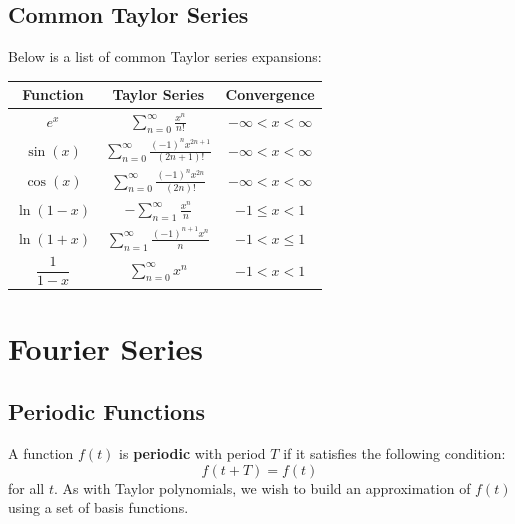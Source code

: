 \documentclass{article}
\begin{document}
\subsection{Common Taylor Series}
Below is a list of common Taylor series expansions:
\begin{table}[H]
    \centering
    \begin{tabular}{c c c}
        \toprule
        \textbf{Function}             & \textbf{Taylor Series}                                                                           & \textbf{Convergence}     \\
        \midrule
        \(e^x\)                       & \(\displaystyle\sum_{n=0}^{\infty} \frac{x^n}{n!}\)                                              & \(-\infty < x < \infty\) \\
        \(\sin{\left( x \right)}\)    & \(\displaystyle\sum_{n=0}^{\infty} \frac{{\left( -1 \right)}^n x^{2n+1}}{\left( 2n+1 \right)!}\) & \(-\infty < x < \infty\) \\
        \(\cos{\left( x \right)}\)    & \(\displaystyle\sum_{n=0}^{\infty} \frac{{\left( -1 \right)}^n x^{2n}}{\left( 2n \right)!}\)     & \(-\infty < x < \infty\) \\
        \(\ln{\left( 1 - x \right)}\) & \(\displaystyle-\sum_{n=1}^{\infty} \frac{x^n}{n}\)                                              & \(-1 \leqslant x < 1\)   \\
        \(\ln{\left( 1 + x \right)}\) & \(\displaystyle\sum_{n=1}^{\infty} \frac{{\left( -1 \right)}^{n+1} x^n}{n}\)                     & \(-1 < x \leqslant 1\)   \\
        \(\dfrac{1}{1 - x}\)          & \(\displaystyle\sum_{n=0}^{\infty} x^n\)                                                         & \(-1 < x < 1\)           \\
        \bottomrule
    \end{tabular}
\end{table}
\section{Fourier Series}
\subsection{Periodic Functions}
A function \(f\left( t \right)\) is \textbf{periodic} with period \(T\)
if it satisfies the following condition:
\begin{equation*}
    f\left( t + T \right) = f\left( t \right)
\end{equation*}
for all \(t\). As with Taylor polynomials, we wish to build an
approximation of \(f\left( t \right)\) using a set of basis functions.
\end{document}
